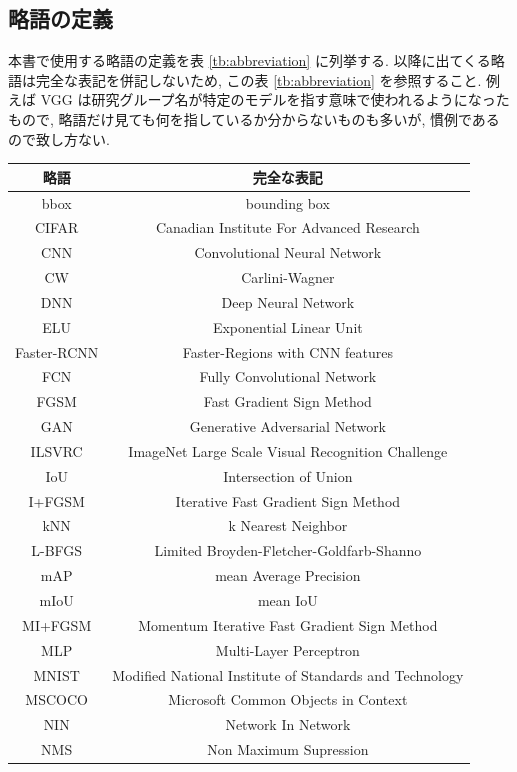 \subsection{略語の定義}
\label{subsec:definition-abbreviations}
本書で使用する略語の定義を表 \ref{tb:abbreviation} に列挙する.
以降に出てくる略語は完全な表記を併記しないため, この表 \ref{tb:abbreviation} を参照すること.
例えば VGG は研究グループ名が特定のモデルを指す意味で使われるようになったもので, 略語だけ見ても何を指しているか分からないものも多いが, 慣例であるので致し方ない.
%
\begin{table}[htbp]
\begin{center}
\begin{tabular}{c|c}
\hline
略語 & 完全な表記 \\
\hline
bbox & bounding box \\
CIFAR & Canadian Institute For Advanced Research \\
CNN & Convolutional Neural Network \\
CW & Carlini-Wagner \\
DNN & Deep Neural Network \\
ELU & Exponential Linear Unit \\
Faster-RCNN & Faster-Regions with CNN features \\
FCN & Fully Convolutional Network \\
FGSM & Fast Gradient Sign Method \\
GAN & Generative Adversarial Network \\
ILSVRC & ImageNet Large Scale Visual Recognition Challenge \\
IoU & Intersection of Union \\
I+FGSM & Iterative Fast Gradient Sign Method \\
kNN & k Nearest Neighbor \\
L-BFGS & Limited Broyden-Fletcher-Goldfarb-Shanno \\
mAP & mean Average Precision \\
mIoU & mean IoU \\
MI+FGSM & Momentum Iterative Fast Gradient Sign Method \\
MLP & Multi-Layer Perceptron \\
MNIST & Modified National Institute of Standards and Technology \\
MSCOCO & Microsoft Common Objects in Context \\
NIN & Network In Network \\
NMS & Non Maximum Supression \\

\end{tabular}
\end{center}
\end{table}
